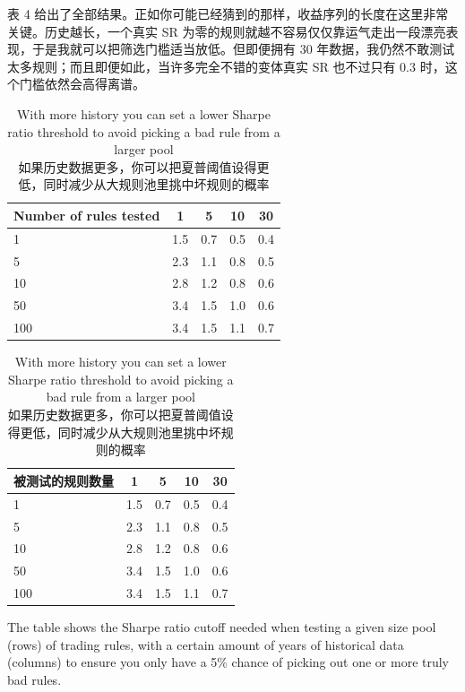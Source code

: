 \begin{chineseblock}表 4 给出了全部结果。正如你可能已经猜到的那样，收益序列的长度在这里非常关键。历史越长，一个真实 SR 为零的规则就越不容易仅仅靠运气走出一段漂亮表现，于是我就可以把筛选门槛适当放低。但即便拥有 30 年数据，我仍然不敢测试太多规则；而且即便如此，当许多完全不错的变体真实 SR 也不过只有 0.3 时，这个门槛依然会高得离谱。\end{chineseblock}

\begin{table}[htbp] \centering \small \caption{With more history you can set a lower Sharpe ratio threshold to avoid picking a bad rule from a larger pool\\
如果历史数据更多，你可以把夏普阈值设得更低，同时减少从大规则池里挑中坏规则的概率}\begin{englishtableblock} \begin{tabular}{@{} lcccc@{}}
\toprule
Number of rules tested & 1 & 5 & 10 & 30 \\
\midrule
1 & 1.5 & 0.7 & 0.5 & 0.4 \\
5 & 2.3 & 1.1 & 0.8 & 0.5 \\
10 & 2.8 & 1.2 & 0.8 & 0.6 \\
50 & 3.4 & 1.5 & 1.0 & 0.6 \\
100 & 3.4 & 1.5 & 1.1 & 0.7 \\
\bottomrule
\end{tabular}
\end{englishtableblock}

  \medskip

\begin{chinesetableblock} \begin{tabular}{@{} lcccc@{}}
\toprule
被测试的规则数量 & 1 & 5 & 10 & 30 \\
\midrule
1 & 1.5 & 0.7 & 0.5 & 0.4 \\
5 & 2.3 & 1.1 & 0.8 & 0.5 \\
10 & 2.8 & 1.2 & 0.8 & 0.6 \\
50 & 3.4 & 1.5 & 1.0 & 0.6 \\
100 & 3.4 & 1.5 & 1.1 & 0.7 \\
\bottomrule
\end{tabular}
\end{chinesetableblock}
\end{table}

\begin{englishblock} The table shows the Sharpe ratio cutoff needed when testing a given size pool (rows) of trading rules, with a certain amount of years of historical data (columns) to ensure you only have a 5\% chance of picking out one or more truly bad rules. \end{englishblock}

